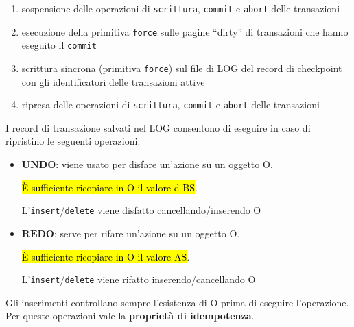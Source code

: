 \begin{itemize}[label=$\triangleright$, itemsep=\medskipamount]
\begin{itemize}[label=$\circ$, itemsep=\smallskipamount]
\begin{itemize}[itemsep=\smallskipamount]
      \begin{enumerate}[itemsep=\smallskipamount]
        \item sospensione delle operazioni di \texttt{scrittura}, \texttt{commit} e \texttt{abort} delle transazioni
        \item esecuzione della primitiva \texttt{force} sulle pagine ``dirty'' di transazioni che hanno eseguito il \texttt{commit}
        \item scrittura sincrona (primitiva \texttt{force}) sul file di LOG del record di checkpoint con gli identificatori delle transazioni attive
        \item ripresa delle operazioni di \texttt{scrittura}, \texttt{commit} e \texttt{abort} delle transazioni
      \end{enumerate}
    \end{itemize}
  \end{itemize}
\end{itemize}

I record di transazione salvati nel LOG consentono di eseguire in caso di ripristino le seguenti operazioni:
\begin{itemize}[label=$\triangleright$, itemsep=\smallskipamount]
  \item $\mathbf{UNDO}$: viene usato per disfare un'azione su un oggetto $\mathrm{O}$.
  
  \hl{È sufficiente ricopiare in $\mathrm{O}$ il valore d $\mathrm{BS}$}.
  
  L'\texttt{insert}/\texttt{delete} viene disfatto cancellando/inserendo $\mathrm{O}$
  \item $\mathbf{REDO}$: serve per rifare un'azione su un oggetto $\mathrm{O}$.
  
  \hl{È sufficiente ricopiare in $\mathrm{O}$ il valore $\mathrm{AS}$}.
  
  L'\texttt{insert}/\texttt{delete} viene rifatto inserendo/cancellando $\mathrm{O}$
\end{itemize}

\medskip
Gli inserimenti controllano sempre l’esistenza di $\mathrm{O}$ prima di eseguire l'operazione.\\[0.2ex]
Per queste operazioni vale la \textbf{proprietà di idempotenza}.


